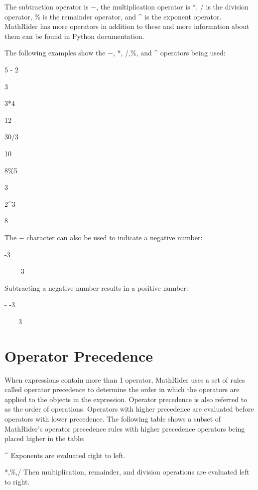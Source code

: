 \documentclass[12pt,oneside]{book}
\begin{document}
The subtraction operator is $-$, the multiplication operator is *, / is the division operator, \% is the remainder operator, and \^{} is the exponent operator. MathRider has more operators in addition to these and more information about them can be found in Python documentation. 

The following examples show the $-$, *, /,\%, and \^{} operators being used:


5 {}- 2

{\textbar}

3


3*4

{\textbar}

12


30/3

{\textbar}

10


8\%5

{\textbar}

3


2\^{}3

{\textbar}

8


The $-$ character can also be used to indicate a negative number:


{}-3

{\textbar}

\ \ \ \ {}-3


Subtracting a negative number results in a positive number:


{}- {}-3

{\textbar}

\ \ \ \ 3

\section[Operator Precedence]{Operator Precedence}

When expressions contain more than 1 operator, MathRider uses a set of rules called operator precedence to determine the order in which the operators are applied to the objects in the expression. Operator precedence is also referred to as the order of operations. Operators with higher precedence are evaluated before operators with lower precedence. The following table shows a subset of MathRider's operator precedence rules with higher precedence operators being placed higher in the table: 

\^{} Exponents are evaluated right to left.


*,\%,/ Then multiplication, remainder, and division operations are evaluated left to right. 
\end{document}
